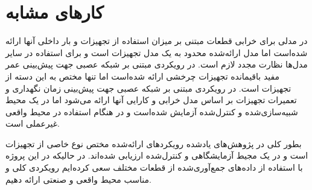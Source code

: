 \section{کارهای مشابه}
در \cite{tinga2010application} مدلی برای خرابی قطعات مبتنی بر میزان استفاده از تجهیزات و بار داخلی آنها ارائه شده‌است اما مدل ارائه‌شده محدود به یک مدل تجهیزات است و برای استفاده در سایر مدل‌ها نظارت مجدد لازم است. در \cite{wu2007neural} رویکردی مبتنی بر شبکه عصبی جهت پیش‌بینی عمر مفید باقیمانده تجهیزات چرخشی ارائه شده‌است اما تنها مختص به این دسته از تجهیزات است. در \cite{kaiser2009predictive} رویکردی مبتنی بر شبکه عصبی جهت پیش‌بینی زمان نگهداری و تعمیرات تجهیزات بر اساس مدل خرابی و کارایی آنها ارائه می‌شود اما در یک محیط شبیه‌سازی‌شده و کنترل‌شده آزمایش شده‌است و در هنگام استفاده در محیط واقعی غیرعملی است.

بطور کلی در پژوهش‌های یادشده رویکرد‌های ارائه‌شده مختص نوع خاصی از تجهیزات است و در یک مجیط آزمایشگاهی و کنترل‌شده ارزیابی شده‌اند. در حالیکه در این پروژه با استفاده از داده‌های جمع‌آوری‌شده از قطعات مختلف سعی کرده‌ایم رویکردی کلی و مناسب محیط واقعی و صنعتی ارائه دهیم.

